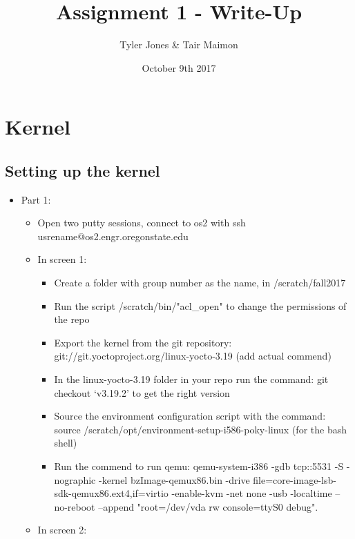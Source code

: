 \documentclass{article}
\title{Assignment 1 - Write-Up}
\author{Tyler Jones & Tair Maimon}
\date{October 9th 2017}
\begin{document}
\maketitle

\newpage
\section{Kernel}

\subsection {Setting up the kernel}
\begin{itemize}
\item Part 1:
\begin{itemize}
\item Open two putty sessions, connect to os2 with ssh usrename@os2.engr.oregonstate.edu
\item In screen 1:
\begin{itemize}

\item Create a folder with group number as the name, in /scratch/fall2017
\item Run the script /scratch/bin/"acl\_open" to change the permissions of the repo
\item Export the kernel from the git repository: git://git.yoctoproject.org/linux-yocto-3.19 (add actual commend)
\item In the linux-yocto-3.19 folder in your repo run the command: git checkout ‘v3.19.2’ to get the right version
\item Source the environment configuration script with the command: source /scratch/opt/environment-setup-i586-poky-linux (for the bash shell)
\item Run the commend to run qemu: qemu-system-i386 -gdb tcp::5531 -S -nographic -kernel bzImage-qemux86.bin -drive file=core-image-lsb-sdk-qemux86.ext4,if=virtio -enable-kvm -net none -usb -localtime --no-reboot --append "root=/dev/vda rw console=ttyS0 debug".
\end{itemize}


\item In screen 2:
\begin{itemize}


\end{itemize}
\end{itemize}
\end{itemize}
\end{document}
